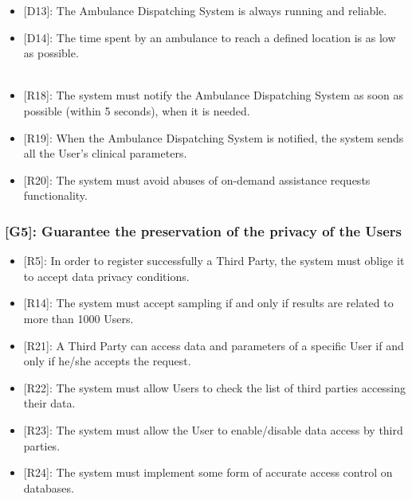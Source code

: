 \documentclass[12pt,a4paper]{article}
\begin{document}
\begin{itemize}
\begin{itemize}
				\item {[D13]}: The Ambulance Dispatching System is always running and reliable.
				\item {[D14]}: The time spent by an ambulance to reach a defined location is as low as possible.
				\\ \\
				\item {[R18]}: The system must notify the Ambulance Dispatching System as soon as possible (within 5 seconds), when it is needed.
				\item {[R19]}: When the Ambulance Dispatching System is notified, the system sends all the User's clinical parameters.
				\item {[R20]}: The system must avoid abuses of on-demand assistance requests functionality.
			\end{itemize}
		\end{itemize}
	
	\subsubsection*{{[}{G5}{]}: Guarantee the preservation of the privacy of the Users}
	\begin{itemize}
		\begin{itemize}
			\item {[R5]}: In order to register successfully a Third Party, the system must oblige it to accept data privacy conditions.
			\item {[R14]}: The system must accept sampling if and only if results are related to more than 1000 Users.
			\item {[R21]}: A Third Party can access data and parameters of a specific User if and only if he/she accepts the request.
			\item {[R22]}: The system must allow Users to check the list of third parties accessing their data.
			\item {[R23]}: The system must allow the User to enable/disable data access by third parties.
			\item {[R24]}: The system must implement some form of accurate access control on databases.
		\end{itemize}
	\end{itemize}

	\newpage
\end{document}
